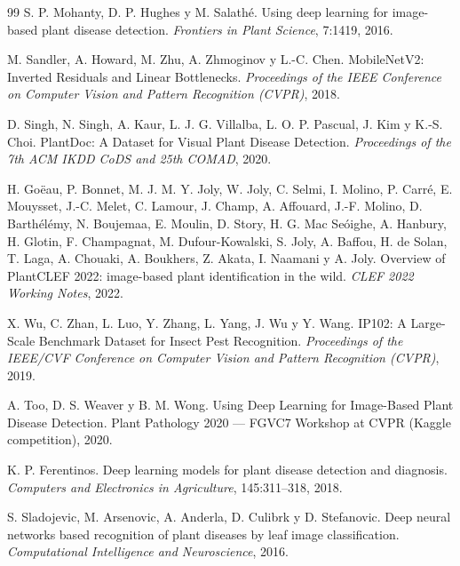 \documentclass[11pt,spanish,listoffigures,listoftables]{tfgetsinf}
\begin{document}
\begin{thebibliography}{99}
S. P. Mohanty, D. P. Hughes y M. Salathé.
\newblock Using deep learning for image-based plant disease detection.
\newblock \textit{Frontiers in Plant Science}, 7:1419, 2016.

M. Sandler, A. Howard, M. Zhu, A. Zhmoginov y L.-C. Chen.
\newblock MobileNetV2: Inverted Residuals and Linear Bottlenecks.
\newblock \textit{Proceedings of the IEEE Conference on Computer Vision and Pattern Recognition (CVPR)}, 2018.

D. Singh, N. Singh, A. Kaur, L. J. G. Villalba, L. O. P. Pascual, J. Kim y K.-S. Choi.
\newblock PlantDoc: A Dataset for Visual Plant Disease Detection.
\newblock \textit{Proceedings of the 7th ACM IKDD CoDS and 25th COMAD}, 2020.

H. Goëau, P. Bonnet, M. J. M. Y. Joly, W. Joly, C. Selmi, I. Molino, P. Carré, E. Mouysset, J.-C. Melet, C. Lamour, J. Champ, A. Affouard, J.-F. Molino, D. Barthélémy, N. Boujemaa, E. Moulin, D. Story, H. G. Mac Seóighe, A. Hanbury, H. Glotin, F. Champagnat, M. Dufour-Kowalski, S. Joly, A. Baffou, H. de Solan, T. Laga, A. Chouaki, A. Boukhers, Z. Akata, I. Naamani y A. Joly.
\newblock Overview of PlantCLEF 2022: image-based plant identification in the wild.
\newblock \textit{CLEF 2022 Working Notes}, 2022.

X. Wu, C. Zhan, L. Luo, Y. Zhang, L. Yang, J. Wu y Y. Wang.
\newblock IP102: A Large-Scale Benchmark Dataset for Insect Pest Recognition.
\newblock \textit{Proceedings of the IEEE/CVF Conference on Computer Vision and Pattern Recognition (CVPR)}, 2019.

A. Too, D. S. Weaver y B. M. Wong.
\newblock Using Deep Learning for Image-Based Plant Disease Detection.
\newblock Plant Pathology 2020 --- FGVC7 Workshop at CVPR (Kaggle competition), 2020.

K. P. Ferentinos.
\newblock Deep learning models for plant disease detection and diagnosis.
\newblock \textit{Computers and Electronics in Agriculture}, 145:311--318, 2018.

S. Sladojevic, M. Arsenovic, A. Anderla, D. Culibrk y D. Stefanovic.
\newblock Deep neural networks based recognition of plant diseases by leaf image classification.
\newblock \textit{Computational Intelligence and Neuroscience}, 2016.


\end{thebibliography}
\end{document}
